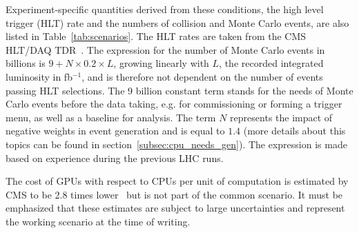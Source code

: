 \documentclass{cmspaper}
\begin{document}
Experiment-specific quantities derived from these conditions, the high level trigger (HLT) rate and the numbers of collision and Monte Carlo events, are also listed in Table~\ref{tab:scenarios}. The HLT rates are taken from the CMS HLT/DAQ TDR~\cite{CMS-TDR-21-007}. The expression for the number of Monte Carlo events in billions is $9 + N\times 0.2\times L$, growing linearly with $L$, the recorded integrated luminosity in fb$^{-1}$, and is therefore not dependent on the number of events passing HLT selections. The 9 billion constant term stands for the needs of Monte Carlo events before the data taking, e.g. for commissioning or forming a trigger menu, as well as a baseline for analysis. The term $N$ represents the impact of negative weights in event generation and is equal to $1.4$ (more details about this topics can be found in section~\ref{subsec:cpu_needs_gen}). The expression is made based on experience during the previous LHC runs.

The cost of GPUs with respect to CPUs per unit of computation is estimated by CMS to be 2.8 times lower~\cite{CMS-TDR-21-007} but is not part of the common scenario. It must be emphasized that these estimates are subject to large uncertainties and represent the working scenario at the time of writing.
\end{document}
